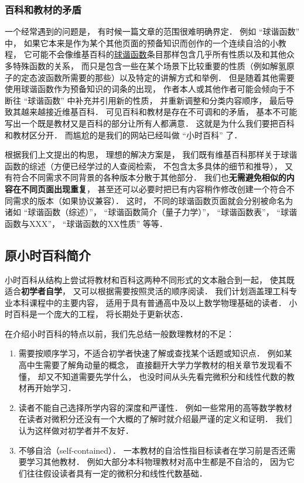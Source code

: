 \subsubsection{百科和教材的矛盾}
一个经常遇到的问题是， 有时候一篇文章的范围很难明确界定． 例如 “球谐函数” 中， 如果它本来是作为某个其他页面的预备知识而创作的一个连续自洽的小教程， 它可能不会像维基百科的\href{https://en.wikipedia.org/wiki/Spherical_harmonics}{球谐函数}条目那样包含几乎所有性质以及和其他众多特殊函数的关系， 而只是包含一些在某个场景下比较重要的性质（例如解氢原子的定态波函数所需要的那些）以及特定的讲解方式和举例． 但是随着其他需要使用球谐函数作为预备知识的词条的出现， 作者本人或其他作者可能会倾向于不断往 “球谐函数” 中补充并引用新的性质， 并重新调整和分类内容顺序， 最后导致其越来越接近维基百科． 可见百科和教材是存在不可调和的矛盾， 基本不可能写出一个既是教材又是百科的部分让所有人都满意． 这就是为什么我们要把百科和教材区分开． 而尴尬的是我们的网站已经叫做 “小时百科” 了．

根据我们上文提出的构思， 理想的解决方案是， 我们既有维基百科那样关于球谐函数的综述（方便已经学过的人查阅检索， 不包含太多具体的细节和推导）， 又有符合不同需求不同背景的各种版本分散于其他部分． 我们也\textbf{无需避免相似的内容在不同页面出现重复}， 甚至还可以必要时把已有内容稍作修改创建一个符合不同需求的版本（如果协议兼容）． 这时， 不同的球谐函数页面就会分别被命名为诸如 “球谐函数（综述）”， “球谐函数简介（量子力学）”， “球谐函数表”， “球谐函数与XXX”， “球谐函数的XX性质” 等等．

\subsection{原小时百科简介}\label{about_sub1}

小时百科从结构上尝试将教材和百科这两种不同形式的文本融合到一起， 使其既适合\textbf{初学者自学}， 又可以根据需要按照灵活的顺序阅读． 我们计划涵盖理工科专业本科课程中的主要内容， 适用于具有普通高中及以上数学物理基础的读者． 小时百科是一个庞大的工程， 将长期处于更新状态．

在介绍小时百科的特点以前，我们先总结一般数理教材的不足：
\begin{enumerate}
\item 需要按顺序学习，不适合初学者快速了解或查找某个话题或知识点． 例如某高中生需要了解角动量的概念， 直接翻开大学力学教材的相关章节发现看不懂， 却又不知道需要先学什么， 也没时间从头先看完微积分和线性代数的教材再开始学习．
\item 读者不能自己选择所学内容的深度和严谨性． 例如一些常用的高等数学教材在读者对微积分还没有一个大概的了解时就介绍最严谨的定义和证明． 我们认为这样做对初学者并不友好．
\item 不够自洽（self-contained）． 一本教材的自洽性指目标读者在学习前是否还需要学习其他教材． 例如大部分本科物理教材对高中生都是不自洽的， 因为它们往往假设读者具有一定的微积分和线性代数基础．
\end{enumerate}

